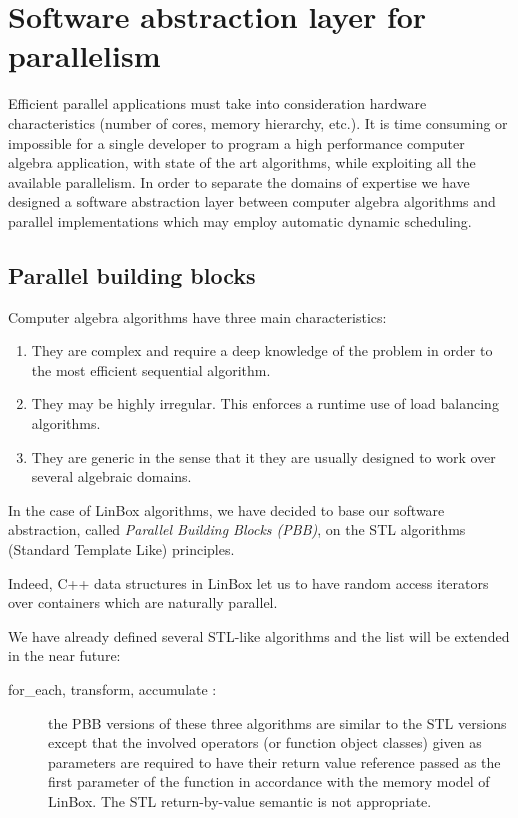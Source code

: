 \documentclass[runningheads,a4paper]{llncs}
\newcommand{\linbox}{{\sc LinBox}\xspace}
\begin{document}
\section{Software abstraction layer for parallelism}

Efficient parallel applications must take into consideration hardware
characteristics (number of cores, memory hierarchy, etc.). It is time
consuming or impossible for a single developer to 
program a high performance computer algebra application, with state of
the art algorithms, while exploiting all the available parallelism.  
In order to separate the domains of expertise we have designed a
software abstraction layer between computer algebra algorithms
and parallel implementations which may employ automatic dynamic scheduling.

\subsection{Parallel building blocks}\label{ssec:parallel}
Computer algebra algorithms have three main characteristics:
\begin{enumerate}
\item They are complex and require a deep knowledge of the problem in
  order to the most efficient sequential algorithm.
\item They may be highly irregular. This enforces a runtime use of
  load balancing algorithms.
\item They are generic in the sense that it they are usually designed
  to work over several algebraic domains.
\end{enumerate}

  In the case of \linbox algorithms, we have decided to base our
  software abstraction, called {\em Parallel Building Blocks (PBB)},
  on the STL algorithms (Standard Template Like) principles.

  Indeed, C++ data structures in \linbox let us to have random access
  iterators over containers which are naturally parallel. 
  
  We have already defined several STL-like algorithms and the list
  will be extended in the near future:
  \begin{description} 
    
  \item [for\_each, transform, accumulate \cite{Musser:1996:STL}:] the PBB
    versions of these three algorithms are similar to the STL versions 
    except that the involved operators (or function object classes) given as 
    parameters are required to have their return value reference passed as the
    first parameter of the function in accordance with the memory model 
	of \linbox. 
    The STL return-by-value semantic is not appropriate. 
  \end{description} 
  
\end{document}

